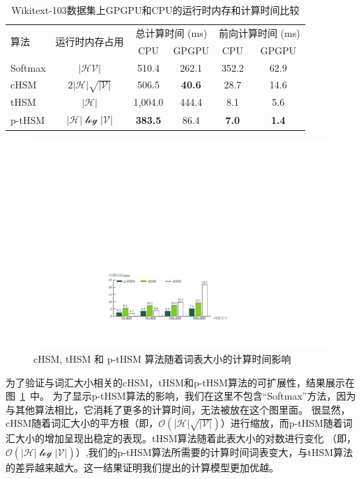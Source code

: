 \begin{table}[!t]
  \centering
  \caption{Wikitext-103数据集上GPGPU和CPU的运行时内存和计算时间比较\label{tab:time}}
\begin{tabular}{lccccc}
  \toprule
 \multirow{2}{*}{算法}  &\multirow{2}{*}{运行时内存占用} &\multicolumn{2}{c}{总计算时间 (ms)} & \multicolumn{2}{c}{前向计算时间 (ms)}   \\
   \cmidrule(lr){3-4}  \cmidrule(lr){5-6}
	& & CPU&GPGPU & CPU& GPGPU \\ \midrule
Softmax & $\mathcal{|HV|}$ &510.4  &262.1&352.2& 62.9 \\
cHSM    & $2\mathcal{|H|\sqrt{|V|}}$&506.5  &\textbf{40.6}&28.7&14.6 \\
tHSM    &$\mathcal{|H|}$&1,004.0 &444.4 & 8.1&  5.6   \\
p-tHSM  &$\mathcal{|H|\log{|V|}}$ &\textbf{383.5}&	86.4 &\textbf{7.0}&	\textbf{1.4} \\
  \bottomrule
\end{tabular}
\end{table}

\begin{figure}[!t]
  \centering
  \includegraphics[width=.87\columnwidth]{./figures/all_time.pdf}
  \caption{cHSM, tHSM 和 p-tHSM 算法随着词表大小的计算时间影响}\label{fig:hsm_benchmark}
\end{figure}


为了验证与词汇大小相关的cHSM，tHSM和p-tHSM算法的可扩展性，结果展示在图~\ref{fig:hsm_benchmark}~中。 为了显示p-tHSM算法的影响，我们在这里不包含“Softmax”方法，因为与其他算法相比，它消耗了更多的计算时间，无法被放在这个图里面。 很显然，cHSM随着词汇大小的平方根（即，$ \mathcal{O(| H | \sqrt{| V |})} $）进行缩放，而p-tHSM随着词汇大小的增加呈现出稳定的表现。tHSM算法随着此表大小的对数进行变化 （即，$ \mathcal{O(| H | \log{| V |})} $）,我们的p-tHSM算法所需要的计算时间词表变大，与tHSM算法的差异越来越大。这一结果证明我们提出的计算模型更加优越。


